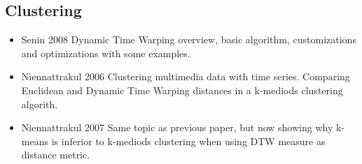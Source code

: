\subsection{Clustering}
\begin{itemize}
    \item Senin 2008 \citep{Senin2008} Dynamic Time Warping overview, basic algorithm, customizations and optimizations with some examples.
    \item Niennattrakul 2006 \citep{Niennattrakul2006} Clustering multimedia data with time series. Comparing Euclidean and Dynamic Time Warping distances in a k-mediods clustering algorith.
    \item Niennattrakul 2007 \citep{Niennattrakul2007} Same topic as previous paper, but now showing why k-means is inferior to k-mediods clustering when using DTW measure as distance metric.
\end{itemize}

